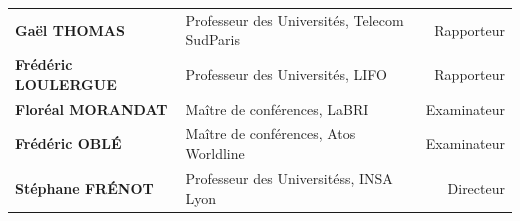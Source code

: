 \begin{center}
\begin{tabu} {l X[l] r}
\textbf{Gaël \MakeUppercase{Thomas}}         & Professeur des Universités, Telecom SudParis & {\color{RED} Rapporteur}\\
\textbf{Frédéric \MakeUppercase{Loulergue}~} & Professeur des Universités, LIFO             & {\color{RED} Rapporteur}\\
\textbf{Floréal \MakeUppercase{Morandat}}    & Maître de conférences, LaBRI                 & {\color{RED} Examinateur}\\
\textbf{Frédéric \MakeUppercase{Oblé}}       & Maître de conférences, Atos Worldline        & {\color{RED} Examinateur}\\
\textbf{Stéphane \MakeUppercase{Frénot}}     & Professeur des Universitéss, INSA Lyon       & {\color{RED} Directeur}\\
\end{tabu}
\end{center}
\restoregeometry
\eject